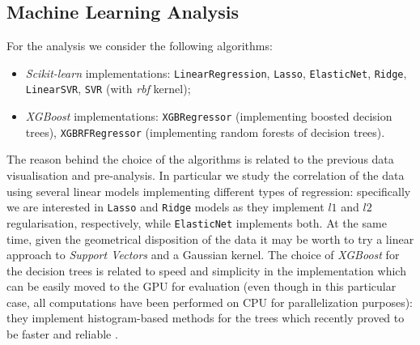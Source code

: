 \subsection{Machine Learning Analysis}
    For the analysis we consider the following algorithms:
    \begin{itemize}
        \item \textit{Scikit-learn} implementations:
            \subitem \texttt{LinearRegression},
            \subitem \texttt{Lasso},
            \subitem \texttt{ElasticNet},
            \subitem \texttt{Ridge},
            \subitem \texttt{LinearSVR},
            \subitem \texttt{SVR} (with \textit{rbf} kernel);
        \item \textit{XGBoost} implementations:
            \subitem \texttt{XGBRegressor} (implementing boosted decision trees),
            \subitem \texttt{XGBRFRegressor} (implementing random forests of decision trees).
    \end{itemize}
    The reason behind the choice of the algorithms is related to the previous data visualisation and pre-analysis. In particular we study the correlation of the data using several linear models implementing different types of regression: specifically we are interested in \texttt{Lasso} and \texttt{Ridge} models as they implement $l1$ and $l2$ regularisation, respectively, while \texttt{ElasticNet} implements both. At the same time, given the geometrical disposition of the data it may be worth to try a linear approach to \textit{Support Vectors} and a Gaussian kernel. The choice of \textit{XGBoost} for the decision trees is related to speed and simplicity in the implementation which can be easily moved to the GPU for evaluation (even though in this particular case, all computations have been performed on CPU for parallelization purposes): they implement histogram-based methods for the trees which recently proved to be faster and reliable \cite{ke2017lightgbm}.

